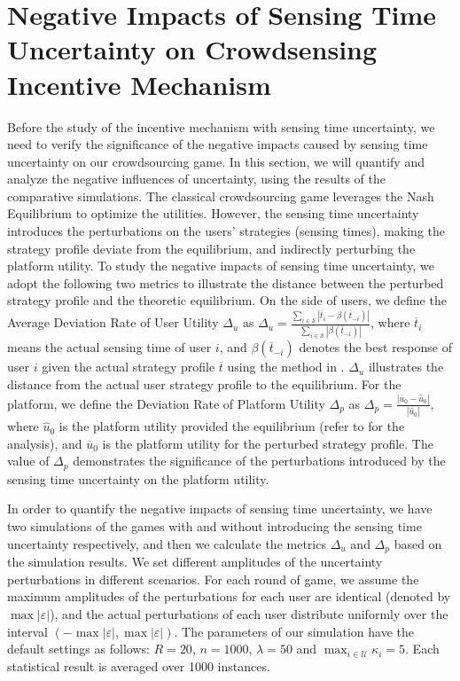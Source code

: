 \documentclass{IEEEtran}
\begin{document}
\section{Negative Impacts of Sensing {\color{black}Time} Uncertainty on Crowdsensing Incentive Mechanism}
\label{sec:impact}
{\color{black}Before the study of the incentive mechanism with sensing {\color{black}time} uncertainty, we need to verify the significance of the negative impacts caused by sensing {\color{black}time} uncertainty on our crowdsourcing game. In this section, we will quantify and analyze the negative influences of uncertainty, using the results of the comparative simulations. The classical crowdsourcing game leverages the Nash Equilibrium to optimize the utilities.} However, the sensing {\color{black}time} uncertainty introduces the perturbations on the users\rq{} strategies (sensing times), making the strategy profile deviate from the equilibrium, and indirectly perturbing the platform utility. To study the negative impacts of sensing {\color{black}time} uncertainty, we adopt the following two metrics to illustrate the distance between the perturbed strategy profile and the theoretic equilibrium. On the side of users, we define the Average Deviation Rate of User Utility $\Delta_u$ as $\Delta_u = \frac{\sum_{i\in\mathcal{S}}|\overline{t}_i - \beta (\overline{t}_{-i})|}{\sum_{i\in\mathcal{S}}|\beta (\overline{t}_{-i})|}$,
where $\overline{t}_i$ means the actual sensing time of user $i$, and $\beta(\overline{t}_{-i})$ denotes the best response of user $i$ given the actual strategy profile $\overline{t}$ using the method in \cite{yang:crowdsourcing}. $\Delta_u$ illustrates the distance from the actual user strategy profile to the equilibrium. 
For the platform, we define the Deviation Rate of Platform Utility $\Delta_p$ as $\Delta_p = \frac{|\overline{u}_0 - \hat{u}_0|}{|\hat{u}_0|}$, 
where $\hat{u}_0$ is the platform utility provided the equilibrium (refer to \cite{yang:crowdsourcing} for the analysis), and $\overline{u}_0$ is the platform utility for the perturbed strategy profile. The value of $\Delta_p$ demonstrates the significance of the perturbations introduced by the sensing {\color{black}time} uncertainty on the platform utility.

In order to quantify the negative impacts of sensing {\color{black}time} uncertainty, we have two simulations of the games with and without introducing the sensing {\color{black}time} uncertainty respectively, and then we calculate the metrics $\Delta_u$ and $\Delta_p$ based on the simulation results. We set different amplitudes of the uncertainty perturbations in different scenarios. For each round of game, we assume the maximum amplitudes of the perturbations for each user are identical (denoted by $\max{|\varepsilon|}$), and the actual perturbations of each user distribute uniformly over the interval $(-\max{|\varepsilon|},\max{|\varepsilon|})$. The parameters of our simulation have the default settings as follows: $R=20$, $n=1000$, $\lambda=50$ and $\max_{i\in\mathcal{U}}\kappa_i = 5$. Each statistical result is averaged over 1000 instances.
\end{document}
